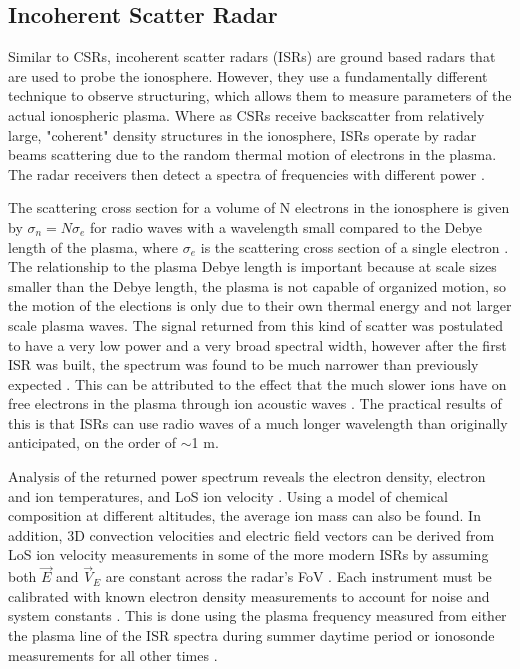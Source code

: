 \subsection{Incoherent Scatter Radar}
\label{sec:isr}
Similar to CSRs, incoherent scatter radars (ISRs) are ground based radars that are used to probe the ionosphere.  However, they use a fundamentally different technique to observe structuring, which allows them to measure parameters of the actual ionospheric plasma.  Where as CSRs receive backscatter from relatively large, "coherent" density structures in the ionosphere, ISRs operate by radar beams scattering due to the random thermal motion of electrons in the plasma.  The radar receivers then detect a spectra of frequencies with different power \citep{Gordon1958}.

The scattering cross section for a volume of N electrons in the ionosphere is given by \(\sigma_n = N \sigma_e\) for radio waves with a wavelength small compared to the Debye length of the plasma, where \(\sigma_e\) is the scattering cross section of a single electron \citep{Gordon1958,Fejer1960}.  The relationship to the plasma Debye length is important because at scale sizes smaller than the Debye length, the plasma is not capable of organized motion, so the motion of the elections is only due to their own thermal energy and not larger scale plasma waves.  The signal returned from this kind of scatter was postulated to have a very low power and a very broad spectral width, however after the first ISR was built, the spectrum was found to be much narrower than previously expected \citep{Evans1969}.  This can be attributed to the effect that the much slower ions have on free electrons in the plasma through ion acoustic waves \citep{Bowles1958}.  The practical results of this is that ISRs can use radio waves of a much longer wavelength than originally anticipated, on the order of \(\sim\)1 m.

Analysis of the returned power spectrum reveals the electron density, electron and ion temperatures, and LoS ion velocity \citep{Evans1969,Rishbeth1985,Nicolls2007}.  Using a model of chemical composition at different altitudes, the average ion mass can also be found.  In addition, 3D convection velocities and electric field vectors can be derived from LoS ion velocity measurements in some of the more modern ISRs by assuming both \(\vec{E}\) and \(\vec{V}_E\) are constant across the radar's FoV \citep{Heinselman2008}.  Each instrument must be calibrated with known electron density measurements to account for noise and system constants \citep{Nicolls2007}.  This is done using the plasma frequency measured from either the plasma line of the ISR spectra during summer daytime period or ionosonde measurements for all other times \citep{Bachivan2010,Themens2014}.

